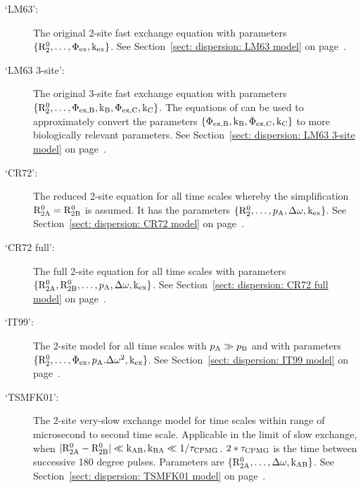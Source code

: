 \begin{description}
\item[`LM63':]  The original \citet{LuzMeiboom63} 2-site fast exchange equation with parameters $\{\mathrm{R}_2^0, \dots, \Phi_\textrm{ex}, \textrm{k}_\textrm{ex}\}$.  See Section~\ref{sect: dispersion: LM63 model} on page~\pageref{sect: dispersion: LM63 model}.
\item[`LM63 3-site':]  The original \citet{LuzMeiboom63} 3-site fast exchange equation with parameters $\{\mathrm{R}_2^0, \dots, \Phi_\textrm{ex,B}, \textrm{k}_\textrm{B}, \Phi_\textrm{ex,C}, \textrm{k}_\textrm{C}\}$.  The equations of \citet{OConnell09} can be used to approximately convert the parameters $\{\Phi_\textrm{ex,B}, \textrm{k}_\textrm{B}, \Phi_\textrm{ex,C}, \textrm{k}_\textrm{C}\}$ to more biologically relevant parameters.  See Section~\ref{sect: dispersion: LM63 3-site model} on page~\pageref{sect: dispersion: LM63 3-site model}.
\item[`CR72':]  The reduced \citet{CarverRichards72} 2-site equation for all time scales whereby the simplification $\mathrm{R}_\mathrm{2A}^0 = \mathrm{R}_\mathrm{2B}^0$ is assumed.  It has the parameters $\{\mathrm{R}_2^0, \dots, p_\textrm{A}, \Delta\omega, \textrm{k}_\textrm{ex}\}$.  See Section~\ref{sect: dispersion: CR72 model} on page~\pageref{sect: dispersion: CR72 model}.
\item[`CR72 full':]  The full \citet{CarverRichards72} 2-site equation for all time scales with parameters $\{\mathrm{R}_\mathrm{2A}^0, \mathrm{R}_\mathrm{2B}^0, \dots, p_\textrm{A}, \Delta\omega, \textrm{k}_\textrm{ex}\}$.  See Section~\ref{sect: dispersion: CR72 full model} on page~\pageref{sect: dispersion: CR72 full model}.
\item[`IT99':]  The \citet{IshimaTorchia99} 2-site model for all time scales with $p_\textrm{A} \gg p_\textrm{B}$ and with parameters $\{\mathrm{R}_2^0, \dots, \Phi_\textrm{ex}, p_\textrm{A}.\Delta\omega^2, \textrm{k}_\textrm{ex}\}$.  See Section~\ref{sect: dispersion: IT99 model} on page~\pageref{sect: dispersion: IT99 model}.
\item[`TSMFK01':]  The \citet{Tollinger01}  2-site very-slow exchange model for time scales within range of microsecond to second time scale.
Applicable in the limit of slow exchange, when $|\mathrm{R}_\mathrm{2A}^0 - \mathrm{R}_\mathrm{2B}^0| \ll \textrm{k}_\textrm{AB}, \textrm{k}_\textrm{BA} \ll 1/\tau_\textrm{CPMG}$.  $2*\tau_\textrm{CPMG}$ is the time between successive 180 degree pulses. Parameters are $\{\mathrm{R}_\mathrm{2A}^0, \dots, \Delta\omega, \textrm{k}_\textrm{AB}\}$.  See Section~\ref{sect: dispersion: TSMFK01 model} on page~\pageref{sect: dispersion: TSMFK01 model}.
\end{description}

